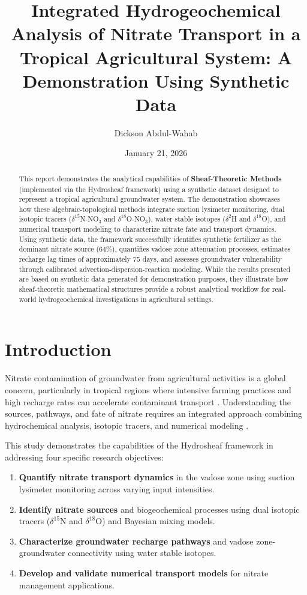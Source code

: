 \documentclass[12pt,a4paper]{article}
\title{Integrated Hydrogeochemical Analysis of Nitrate Transport in a Tropical Agricultural System: A Demonstration Using Synthetic Data}
\author{Dickson Abdul-Wahab}
\date{January 21, 2026}
\begin{document}
\maketitle

\begin{abstract}
	This report demonstrates the analytical capabilities of \textbf{Sheaf-Theoretic Methods} (implemented via the Hydrosheaf framework) using a synthetic dataset designed to represent a tropical agricultural groundwater system. The demonstration showcases how these algebraic-topological methods integrate suction lysimeter monitoring, dual isotopic tracers ($\delta^{15}$N-NO$_3$ and $\delta^{18}$O-NO$_3$), water stable isotopes ($\delta^{2}$H and $\delta^{18}$O), and numerical transport modeling to characterize nitrate fate and transport dynamics. Using synthetic data, the framework successfully identifies synthetic fertilizer as the dominant nitrate source (64\%), quantifies vadose zone attenuation processes, estimates recharge lag times of approximately 75 days, and assesses groundwater vulnerability through calibrated advection-dispersion-reaction modeling. While the results presented are based on synthetic data generated for demonstration purposes, they illustrate how sheaf-theoretic mathematical structures provide a robust analytical workflow for real-world hydrogeochemical investigations in agricultural settings.
\end{abstract}

\section{Introduction}

Nitrate contamination of groundwater from agricultural activities is a global concern, particularly in tropical regions where intensive farming practices and high recharge rates can accelerate contaminant transport \citep{Spalding1993}. Understanding the sources, pathways, and fate of nitrate requires an integrated approach combining hydrochemical analysis, isotopic tracers, and numerical modeling \citep{Kendall1998}.

This study demonstrates the capabilities of the Hydrosheaf framework in addressing four specific research objectives:

\begin{enumerate}
	\item \textbf{Quantify nitrate transport dynamics} in the vadose zone using suction lysimeter monitoring across varying input intensities.
	\item \textbf{Identify nitrate sources} and biogeochemical processes using dual isotopic tracers ($\delta^{15}$N and $\delta^{18}$O) and Bayesian mixing models.
	\item \textbf{Characterize groundwater recharge pathways} and vadose zone-groundwater connectivity using water stable isotopes.
	\item \textbf{Develop and validate numerical transport models} for nitrate management applications.
\end{enumerate}
\end{document}
